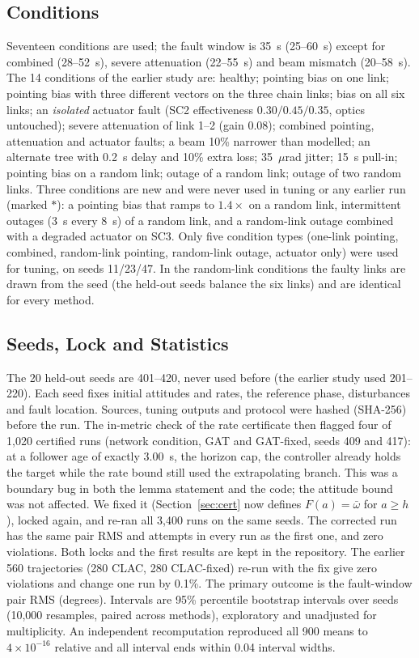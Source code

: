 \documentclass[journal]{IEEEtran}
\begin{document}
\subsection{Conditions}
Seventeen conditions are used; the fault window is 35~s (25--60~s) except for combined (28--52~s), severe attenuation (22--55~s) and beam mismatch (20--58~s). The 14 conditions of the earlier study are: healthy; pointing bias on one link; pointing bias with three different vectors on the three chain links; bias on all six links; an \emph{isolated} actuator fault (SC2 effectiveness $0.30/0.45/0.35$, optics untouched); severe attenuation of link 1--2 (gain 0.08); combined pointing, attenuation and actuator faults; a beam 10\% narrower than modelled; an alternate tree with 0.2~s delay and 10\% extra loss; 35~$\mu$rad jitter; 15~s pull-in; pointing bias on a random link; outage of a random link; outage of two random links. Three conditions are new and were never used in tuning or any earlier run (marked $*$): a pointing bias that ramps to $1.4\times$ on a random link, intermittent outages (3~s every 8~s) of a random link, and a random-link outage combined with a degraded actuator on SC3. Only five condition types (one-link pointing, combined, random-link pointing, random-link outage, actuator only) were used for tuning, on seeds 11/23/47. In the random-link conditions the faulty links are drawn from the seed (the held-out seeds balance the six links) and are identical for every method.

\subsection{Seeds, Lock and Statistics}
The 20 held-out seeds are 401--420, never used before (the earlier study used 201--220). Each seed fixes initial attitudes and rates, the reference phase, disturbances and fault location. Sources, tuning outputs and protocol were hashed (SHA-256) before the run. The in-metric check of the rate certificate then flagged four of 1{,}020 certified runs (network condition, GAT and GAT-fixed, seeds 409 and 417): at a follower age of exactly 3.00~s, the horizon cap, the controller already holds the target while the rate bound still used the extrapolating branch. This was a boundary bug in both the lemma statement and the code; the attitude bound was not affected. We fixed it (Section~\ref{sec:cert} now defines $F(a)=\bar\omega$ for $a\ge h$), locked again, and re-ran all 3{,}400 runs on the same seeds. The corrected run has the same pair RMS and attempts in every run as the first one, and zero violations. Both locks and the first results are kept in the repository. The earlier 560 trajectories (280 CLAC, 280 CLAC-fixed) re-run with the fix give zero violations and change one run by 0.1\%. The primary outcome is the fault-window pair RMS (degrees). Intervals are 95\% percentile bootstrap intervals over seeds (10{,}000 resamples, paired across methods), exploratory and unadjusted for multiplicity. An independent recomputation reproduced all 900 means to $4\times10^{-16}$ relative and all interval ends within 0.04 interval widths.
\end{document}
